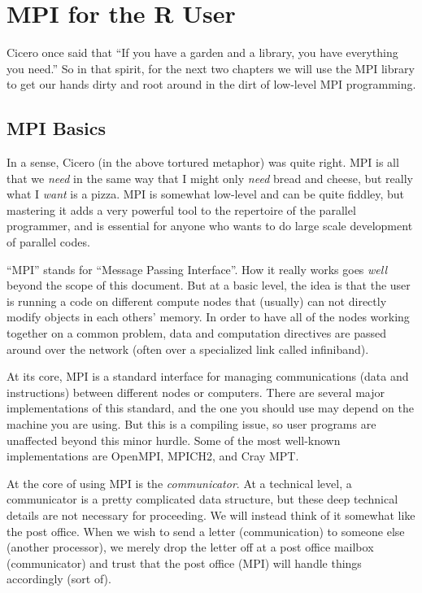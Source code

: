 


\chapter{MPI for the R User}

Cicero once said that ``If you have a garden and a library, you have everything you need.''  So in that spirit, for the next two chapters we will use the MPI library to get our hands dirty and root around in the dirt of low-level MPI programming.

\section{MPI Basics}

In a sense, Cicero (in the above tortured metaphor) was quite right.  MPI is all that we \emph{need} in the same way that I might only \emph{need} bread and cheese, but really what I \emph{want} is a pizza.  MPI is somewhat low-level and can be quite fiddley, but mastering it adds a very powerful tool to the repertoire of the parallel  programmer, and is essential for anyone who wants to do large scale development of parallel codes.  

``MPI'' stands for ``Message Passing Interface''.  How it really works goes \emph{well} beyond the scope of this document.  But at a basic level, the idea is that the user is running a code on different compute nodes that (usually) can not directly modify objects in each others' memory.  In order to have all of the nodes working together on a common problem, data and computation directives are passed around over the network (often over a specialized link called infiniband).  

At its core, MPI is a standard interface for managing communications (data and instructions) between different nodes or computers.  There are several major implementations of this standard, and the one you should use may depend on the machine you are using.  	But this is a compiling issue, so user programs are unaffected beyond this minor hurdle.  Some of the most well-known implementations are OpenMPI, MPICH2, and Cray MPT. 

At the core of using MPI is the \emph{communicator}.  At a technical level, a communicator is a pretty complicated data structure, but these deep technical details are not necessary for proceeding.  We will instead think of it somewhat like the post office.  When we wish to send a letter (communication) to someone else (another processor), we merely drop the letter off at a post office mailbox (communicator) and trust that the post office (MPI) will handle things accordingly (sort of).  

